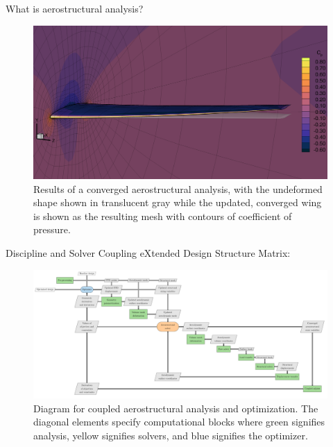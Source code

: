 \documentclass{bredelebeamer}
\begin{document}
\begin{frame}{What is aerostructural analysis?}
\begin{figure}
\includegraphics[width=1.05\linewidth]{images/aerostruct-resultDeformed.png} 
\caption{Results of a converged aerostructural analysis, with the undeformed shape shown in translucent gray while the updated, converged wing is shown as the resulting mesh with contours of coefficient of pressure.}
\end{figure}
\end{frame}

\begin{frame}{Discipline and Solver Coupling}
  eXtended Design Structure Matrix:
  \begin{figure}
    \includegraphics[width=1.0\linewidth]{images/aerostruct-xdsm.pdf} 
    \caption{Diagram for coupled aerostructural analysis and optimization. The diagonal elements specify computational blocks where green signifies analysis, yellow signifies solvers, and blue signifies the optimizer.}
  \end{figure}
\end{frame}
\end{document}
